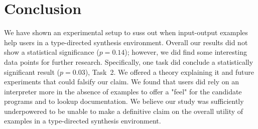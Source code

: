 \section{Conclusion}

We have shown an experimental setup to suss out when input-output examples help
users in a type-directed synthesis environment.
%
Overall our results did not show a statistical significance ($p = 0.14$);
however, we did find some interesting data points for further research.
%
Specifically, one task did conclude a statistically significant result ($p =
0.03$), Task~2.
%
We offered a theory explaining it and future experiments that could falsify our
claim.
%
We found that users did rely on an interpreter more in the absence of examples
to offer a "feel" for the candidate programs and to lookup documentation.
%
We believe our study was sufficiently underpowered to be unable to make a
definitive claim on the overall utility of examples in a type-directed synthesis
environment.